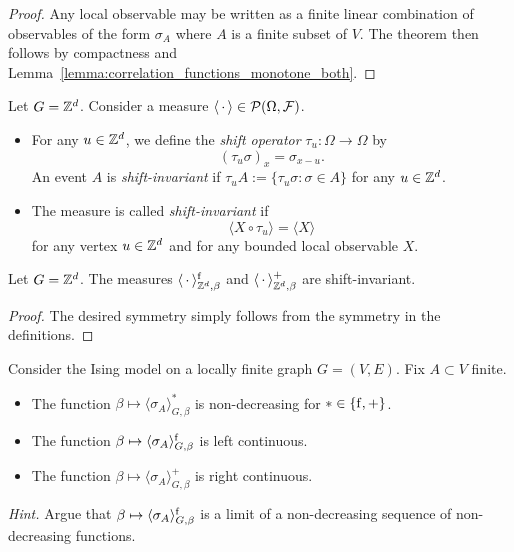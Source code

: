 \begin{proof}
    Any local observable may be written as a finite linear combination
    of observables of the form $\sigma_A$ where $A$ is a finite subset of
    $V$.
    The theorem then follows by compactness and
    Lemma~\ref{lemma:correlation_functions_monotone_both}.
\end{proof}

\begin{definition}
    Let $G=\mathbb Z^d$.
    Consider a measure $\langle\,\cdot\,\rangle\in\mathcal P(\Omega,\mathcal F)$.
    \begin{itemize}
        \item For any $u\in\mathbb Z^d$, we define the \emph{shift operator} $\tau_u:\Omega\to\Omega$ by
            \[
                (\tau_u\sigma)_x = \sigma_{x-u}.
            \]
            An event $A$ is \emph{shift-invariant} if $\tau_uA:=\{\tau_u\sigma:\sigma\in
            A\}$ for any $u\in\mathbb Z^d$.
        \item The measure is called \emph{shift-invariant} if
            \[
                \langle X\circ\tau_u \rangle = \langle X\rangle
            \]
            for any vertex $u\in\mathbb Z^d$ and
            for any bounded local observable $X$.
    \end{itemize}
\end{definition}

\begin{theorem}
    Let $G=\mathbb Z^d$.
    The measures $\langle\,\cdot\,\rangle^{\operatorname{f}}_{\mathbb Z^d,\beta}$ and $\langle\,\cdot\,\rangle^+_{\mathbb Z^d,\beta}$
    are shift-invariant.
\end{theorem}

\begin{proof}
    The desired symmetry simply follows from the symmetry in the definitions.
\end{proof}

\begin{exercise}
    Consider the Ising model on a locally finite graph $G=(V,E)$.
    Fix $A\subset V$ finite.
    \begin{itemize}
        \item The function $\beta\mapsto \langle\sigma_A\rangle_{G,\beta}^*$ is
            non-decreasing for $*\in\{{\operatorname{f}},+\}$.
        \item The function $\beta\mapsto \langle\sigma_A\rangle_{G,\beta}^{\operatorname{f}}$ is left continuous.
        \item The function $\beta\mapsto \langle\sigma_A\rangle_{G,\beta}^+$ is right continuous.
    \end{itemize}
    \emph{Hint.} Argue that $\beta\mapsto \langle\sigma_A\rangle_{G,\beta}^{\operatorname{f}}$
    is a limit of a non-decreasing sequence of non-decreasing functions.
\end{exercise}

